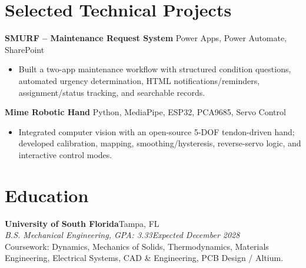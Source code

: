 \documentclass[9pt]{article}
\newcommand{\role}[4]{\textbf{#1}\hfill #2\\\textit{#3}\hfill \textit{#4}\\[-2pt]}
\begin{document}
\section{Selected Technical Projects}
\textbf{SMURF -- Maintenance Request System} \textbar{} Power Apps, Power Automate, SharePoint\\[-2pt]
\begin{itemize}
\item Built a two-app maintenance workflow with structured condition questions, automated urgency determination, HTML notifications/reminders, assignment/status tracking, and searchable records.
\end{itemize}
\textbf{Mime Robotic Hand} \textbar{} Python, MediaPipe, ESP32, PCA9685, Servo Control\\[-2pt]
\begin{itemize}
\item Integrated computer vision with an open-source 5-DOF tendon-driven hand; developed calibration, mapping, smoothing/hysteresis, reverse-servo logic, and interactive control modes.
\end{itemize}

\section{Education}
\role{University of South Florida}{Tampa, FL}{B.S. Mechanical Engineering, GPA: 3.33}{Expected December 2028}
Coursework: Dynamics, Mechanics of Solids, Thermodynamics, Materials Engineering, Electrical Systems, CAD \& Engineering, PCB Design / Altium.
\end{document}
